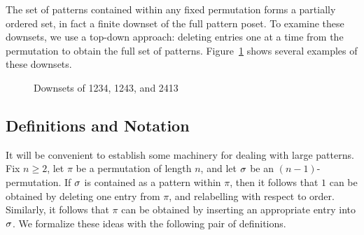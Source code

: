   The set of patterns contained within any fixed permutation forms a partially
  ordered set, in fact a finite downset of the full pattern poset.  To examine
  these downsets, we use a top-down approach: deleting entries one at a time
  from the permutation to obtain the full set of patterns.
  Figure~\ref{fixpat:fig:downsets} shows several examples of these
  downsets. 

  \begin{figure}[t] 
    \centering
  \caption{Downsets of 1234, 1243, and 2413} \label{fixpat:fig:downsets}
  \end{figure}

\subsection{Definitions and Notation}

  It will be convenient to establish some machinery for dealing with large
  patterns. Fix $n \geq 2$, let $\pi$ be a permutation of length $n$, and let $\sigma$ be an
  $(n-1)$-permutation. If $\sigma$ is contained as a pattern within $\pi$, then it
  follows that $1$ can be obtained by deleting one entry from $\pi$, and
  relabelling with respect to order. Similarly, it follows that $\pi$ can be
  obtained by inserting an appropriate entry into $\sigma$. We formalize these ideas
  with the following pair of definitions. 


